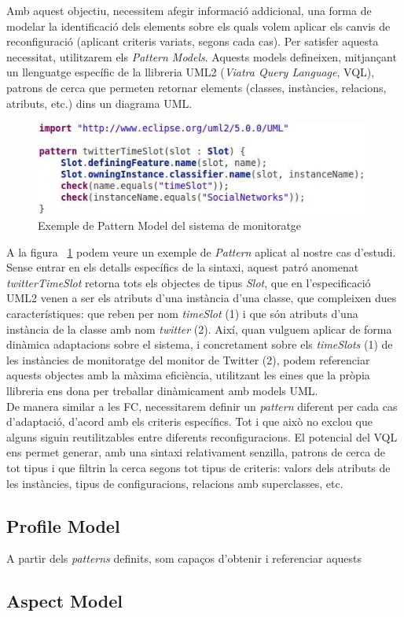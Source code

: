 Amb aquest objectiu, necessitem afegir informació addicional, una forma de modelar la identificació dels elements sobre els quals volem aplicar els canvis de reconfiguració (aplicant criteris variats, segons cada cas). Per satisfer aquesta necessitat, utilitzarem els \textit{Pattern Models}. Aquests models defineixen, mitjançant un llenguatge específic de la llibreria UML2 (\textit{Viatra Query Language}, VQL), patrons de cerca que permeten retornar elements (classes, instàncies, relacions, atributs, etc.) dins un diagrama UML.\\ 

\begin{figure}
\centering
\includegraphics[width=11cm]{Figures/Figure19}
\decoRule
\caption{Exemple de Pattern Model del sistema de monitoratge}
\label{fig:Figura19}
\end{figure}

A la figura ~\ref{fig:Figura19} podem veure un exemple de \textit{Pattern} aplicat al nostre cas d'estudi. Sense entrar en els detalls específics de la sintaxi, aquest patró anomenat \textit{twitterTimeSlot} retorna tots els objectes de tipus \textit{Slot}, que en l'especificació UML2 venen a ser els atributs d'una instància d'una classe, que compleixen dues característiques: que reben per nom \textit{timeSlot} (1) i que són atributs d'una instància de la classe amb nom \textit{twitter} (2). Així, quan vulguem aplicar de forma dinàmica adaptacions sobre el sistema, i concretament sobre els \textit{timeSlots} (1) de les instàncies de monitoratge del monitor de Twitter (2), podem referenciar aquests objectes amb la màxima eficiència, utilitzant les eines que la pròpia llibreria ens dona per treballar dinàmicament amb models UML.\\

De manera similar a les FC, necessitarem definir un \textit{pattern} diferent per cada cas d'adaptació, d'acord amb els criteris específics. Tot i que això no exclou que alguns siguin reutilitzables entre diferents reconfiguracions. El potencial del VQL ens permet generar, amb una sintaxi relativament senzilla, patrons de cerca de tot tipus i que filtrin la cerca segons tot tipus de criteris: valors dels atributs de les instàncies, tipus de configuracions, relacions amb superclasses, etc. 

\subsection{Profile Model}

A partir dels \textit{patterns} definits, som capaços d'obtenir i referenciar aquests  

\subsection{Aspect Model}

